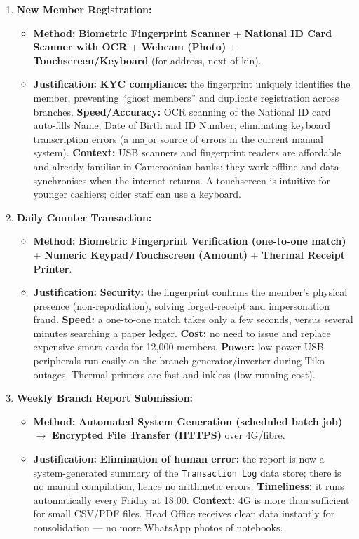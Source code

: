 \documentclass[11pt]{article}
\begin{document}
\begin{enumerate}
    \item \textbf{New Member Registration:}
    \begin{itemize}
        \item \textbf{Method:} \textbf{Biometric Fingerprint Scanner} + \textbf{National ID Card Scanner with OCR} + \textbf{Webcam (Photo)} + \textbf{Touchscreen/Keyboard} (for address, next of kin).
        \item \textbf{Justification:} \textbf{KYC compliance:} the fingerprint uniquely identifies the member, preventing ``ghost members'' and duplicate registration across branches. \textbf{Speed/Accuracy:} OCR scanning of the National ID card auto-fills Name, Date of Birth and ID Number, eliminating keyboard transcription errors (a major source of errors in the current manual system). \textbf{Context:} USB scanners and fingerprint readers are affordable and already familiar in Cameroonian banks; they work offline and data synchronises when the internet returns. A touchscreen is intuitive for younger cashiers; older staff can use a keyboard.
    \end{itemize}
    \item \textbf{Daily Counter Transaction:}
    \begin{itemize}
        \item \textbf{Method:} \textbf{Biometric Fingerprint Verification (one-to-one match)} + \textbf{Numeric Keypad/Touchscreen (Amount)} + \textbf{Thermal Receipt Printer}.
        \item \textbf{Justification:} \textbf{Security:} the fingerprint confirms the member's physical presence (non-repudiation), solving forged-receipt and impersonation fraud. \textbf{Speed:} a one-to-one match takes only a few seconds, versus several minutes searching a paper ledger. \textbf{Cost:} no need to issue and replace expensive smart cards for 12,000 members. \textbf{Power:} low-power USB peripherals run easily on the branch generator/inverter during Tiko outages. Thermal printers are fast and inkless (low running cost).
    \end{itemize}
    \item \textbf{Weekly Branch Report Submission:}
    \begin{itemize}
        \item \textbf{Method:} \textbf{Automated System Generation (scheduled batch job)} $\rightarrow$ \textbf{Encrypted File Transfer (HTTPS)} over 4G/fibre.
        \item \textbf{Justification:} \textbf{Elimination of human error:} the report is now a system-generated summary of the \texttt{Transaction Log} data store; there is no manual compilation, hence no arithmetic errors. \textbf{Timeliness:} it runs automatically every Friday at 18:00. \textbf{Context:} 4G is more than sufficient for small CSV/PDF files. Head Office receives clean data instantly for consolidation --- no more WhatsApp photos of notebooks.
    \end{itemize}
\end{enumerate}
\end{document}
